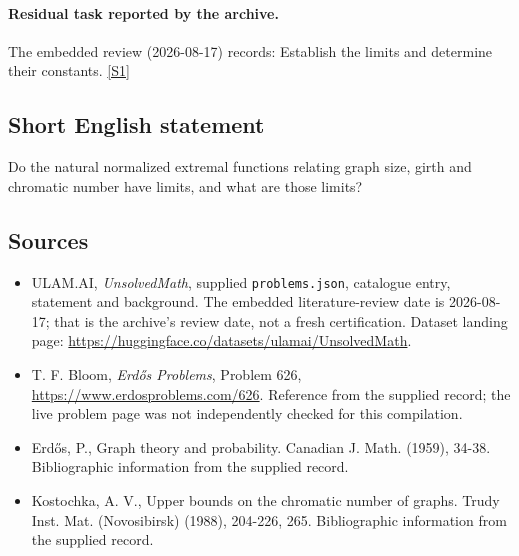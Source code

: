 \documentclass[11pt,a4paper]{article}
\newcommand{\sref}[2]{\hyperlink{source:#1:#2}{[S#2]}}
\begin{document}
\paragraph{Residual task reported by the archive.}

The embedded review (2026-08-17) records: Establish the limits and determine their constants. \sref{statement}{1}

\subsection{Short English statement}

Do the natural normalized extremal functions relating graph size, girth and chromatic number have limits, and what are those limits?

\subsection{Sources}

{\small

\begin{itemize}

\item[\hypertarget{source:statement:1}{S1}] ULAM.AI, \emph{UnsolvedMath}, supplied \texttt{problems.json}, catalogue entry, statement and background. The embedded literature-review date is 2026-08-17; that is the archive’s review date, not a fresh certification. Dataset landing page: \url{https://huggingface.co/datasets/ulamai/UnsolvedMath}.

\item[\hypertarget{source:statement:2}{S2}] T. F. Bloom, \emph{Erdős Problems}, Problem 626, \url{https://www.erdosproblems.com/626}. Reference from the supplied record; the live problem page was not independently checked for this compilation.

\item[\hypertarget{source:statement:3}{S3}] Erd\H{o}s, P., Graph theory and probability. Canadian J. Math. (1959), 34-38. Bibliographic information from the supplied record.

\item[\hypertarget{source:statement:4}{S4}] Kostochka, A. V., Upper bounds on the chromatic number of graphs. Trudy Inst. Mat. (Novosibirsk) (1988), 204-226, 265. Bibliographic information from the supplied record.

\end{itemize}

}

\label{end:statement}
\end{document}
